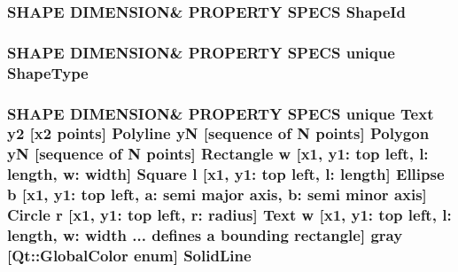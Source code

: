 \subsubsection[{\texorpdfstring{Shape\+Id}{ShapeId}}]{\setlength{\rightskip}{0pt plus 5cm}S\+H\+A\+PE D\+I\+M\+E\+N\+S\+I\+ON\& P\+R\+O\+P\+E\+R\+TY S\+P\+E\+CS Shape\+Id}\hypertarget{shape__input__file__specs_8txt_a467b0c8874f7e5c808ddbfae7144d412}{}\label{shape__input__file__specs_8txt_a467b0c8874f7e5c808ddbfae7144d412}
\subsubsection[{\texorpdfstring{Shape\+Type}{ShapeType}}]{\setlength{\rightskip}{0pt plus 5cm}S\+H\+A\+PE D\+I\+M\+E\+N\+S\+I\+ON\& P\+R\+O\+P\+E\+R\+TY S\+P\+E\+CS unique Shape\+Type}\hypertarget{shape__input__file__specs_8txt_a76cb42f46f7adc2fe2ae77fd213e21e1}{}\label{shape__input__file__specs_8txt_a76cb42f46f7adc2fe2ae77fd213e21e1}
\subsubsection[{\texorpdfstring{Solid\+Line}{SolidLine}}]{\setlength{\rightskip}{0pt plus 5cm}S\+H\+A\+PE D\+I\+M\+E\+N\+S\+I\+ON\& P\+R\+O\+P\+E\+R\+TY S\+P\+E\+CS unique {\bf Text} {\bf y2} \mbox{[}{\bf x2} points\mbox{]} {\bf Polyline} yN \mbox{[}sequence of N points\mbox{]} {\bf Polygon} yN \mbox{[}sequence of N points\mbox{]} {\bf Rectangle} w \mbox{[}{\bf x1}, y1\+: top left, l\+: length, w\+: width\mbox{]} {\bf Square} {\bf l} \mbox{[}{\bf x1}, y1\+: top left, l\+: length\mbox{]} {\bf Ellipse} b \mbox{[}{\bf x1}, y1\+: top left, a\+: semi major axis, b\+: semi minor axis\mbox{]} {\bf Circle} r \mbox{[}{\bf x1}, y1\+: top left, r\+: radius\mbox{]} {\bf Text} w \mbox{[}{\bf x1}, y1\+: top left, l\+: length, w\+: width ... defines {\bf a} bounding rectangle\mbox{]} gray \mbox{[}Qt\+::\+Global\+Color enum\mbox{]} Solid\+Line}\hypertarget{shape__input__file__specs_8txt_a6e3dfa56f90db6599b3b0115169d618f}{}\label{shape__input__file__specs_8txt_a6e3dfa56f90db6599b3b0115169d618f}

